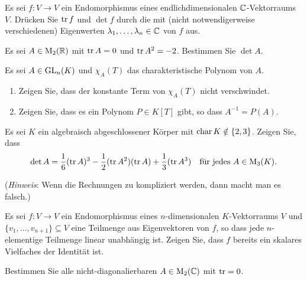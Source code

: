\documentclass[a4paper,10pt]{scrartcl}
\begin{document}
\begin{question}
  Es sei $f \colon V \to V$ ein Endomorphismus eines endlichdimensionalen $\mathbb{C}$-Vektorraums $V$.
  Drücken Sie $\operatorname{tr} f$ und $\det f$ durch die  mit (nicht notwendigerweise verschiedenen) Eigenwerten $\lambda_1, \dotsc, \lambda_n \in \mathbb{C}$ von $f$ aus.
\end{question}


\begin{question}
  Es sei $A \in \operatorname{M}_2(\mathbb{R})$ mit $\operatorname{tr} A = 0$ und $\operatorname{tr} A^2 = -2$.
  Bestimmen Sie $\det A$.
\end{question}


\begin{question}
  Es sei $A \in \operatorname{GL}_n(K)$ und $\chi_A(T)$ das charakteristische Polynom von $A$.
  \begin{enumerate}[leftmargin=*]
    \item
      Zeigen Sie, dass der konstante Term von $\chi_A(T)$ nicht verschwindet.
    \item
      Zeigen Sie, dass es ein Polynom $P \in K[T]$ gibt, so dass $A^{-1} = P(A)$.
  \end{enumerate}
\end{question}


\begin{question}
  Es sei $K$ ein algebraisch abgeschlossener Körper mit $\operatorname{char} K \notin \{2,3\}$.
  Zeigen Sie, dass
  \[
    \det A = \frac{1}{6} (\operatorname{tr} A)^3 - \frac{1}{2} (\operatorname{tr} A^2)(\operatorname{tr} A) + \frac{1}{3} (\operatorname{tr} A^3)
    \quad
    \text{für jedes $A \in \operatorname{M}_3(K)$}.
  \]
  
  (\emph{Hinweis}:
   Wenn die Rechnungen zu kompliziert werden, dann macht man es falsch.)
\end{question}


\begin{question}
  Es sei $f \colon V \to V$ ein Endomorphismus eines $n$-dimensionalen $K$-Vektorraums $V$ und $\{ v_1, \dotsc, v_{n+1} \} \subseteq V$ eine Teilmenge aus Eigenvektoren von $f$, so dass jede $n$-elementige Teilmenge linear unabhängig ist.
  Zeigen Sie, dass $f$ bereits ein skalares Vielfaches der Identität ist.
\end{question}













\begin{question}
  Bestimmen Sie alle nicht-diagonalierbaren $A \in \operatorname{M}_2(\mathbb{C})$ mit $\operatorname{tr} = 0$.
\end{question}
\end{document}
